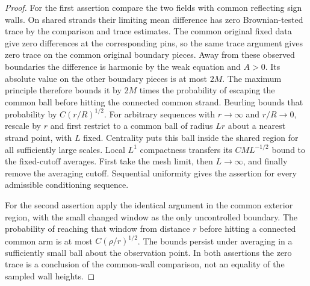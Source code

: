 \begin{proof}
For the first assertion compare the two fields with common reflecting
sign walls. On shared strands their limiting mean difference has zero
Brownian-tested trace by the comparison and trace estimates. The
common original fixed data give zero differences at the corresponding
pins, so the same trace argument gives zero trace on the common
original boundary pieces. Away from these observed boundaries the
difference is harmonic by the weak equation and $A>0$. Its
absolute value on the other boundary pieces is at most $2M$.
The maximum principle therefore bounds it by $2M$ times the
probability of escaping the common ball before hitting the connected
common strand. Beurling bounds that probability by $C(r/R)^{1/2}$.
For arbitrary sequences with $r\to\infty$ and $r/R\to0$, rescale
by $r$ and first restrict to a common ball of radius $Lr$ about a
nearest strand point, with $L$ fixed. Centrality puts this ball inside
the shared region for all sufficiently large scales. Local $L^1$
compactness transfers its $CM L^{-1/2}$ bound to the fixed-cutoff
averages. First take the mesh limit, then $L\to\infty$, and finally
remove the averaging cutoff. Sequential uniformity gives the
assertion for every admissible conditioning sequence.

For the second assertion apply the identical argument in the common
exterior region, with the small changed window as the only uncontrolled
boundary. The probability of reaching that window from distance $r$
before hitting a connected common arm is at most $C(\rho/r)^{1/2}$.
The bounds persist under averaging in a sufficiently small ball about
the observation point. In both assertions the zero trace is a
conclusion of the common-wall comparison, not an equality of the
sampled wall heights.
\end{proof}

